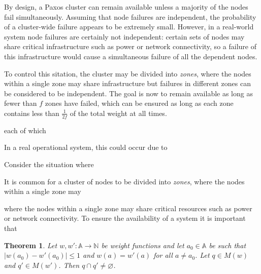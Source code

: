 \documentclass[journal]{IEEEtran}
\newtheorem{theorem}{Theorem}
\begin{document}
By design, a Paxos cluster can remain available unless a majority of the nodes
fail simultaneously. Assuming that node failures are independent, the
probability of a cluster-wide failure appears to be extremely small. However,
in a real-world system node failures are certainly not independent: certain
sets of nodes may share critical infrastructure such as power or network
connectivity, so a failure of this infrastructure would cause a simultaneous
failure of all the dependent nodes.

To control this sitation, the cluster may be divided into \textit{zones}, where
the nodes within a single zone may share infrastructure but failures in
different zones can be considered to be independent. The goal is now to remain
available as long as fewer than $f$ zones have failed, which can be ensured as
long as each zone contains less than $\frac{1}{2f}$ of the total weight at all
times.


each of which 

In a real operational system, this could occur
due to 

Consider the situation where 

It is common for a cluster of nodes to be divided into \textit{zones},
where the nodes within a single zone may 

where the nodes within a single zone may share critical resources such as power
or network connectivity. To ensure the availability of a system it is important
that 



\begin{theorem} \label{weights-nearly-equal} Let $w, w' : \mathbb A \to \mathbb
N$ be weight functions and let $a_0 \in \mathbb A$ be such that $|w(a_0) -
w'(a_0)| \le 1$ and $w(a) = w'(a)$ for all $a \ne a_0$.  Let $q \in M(w)$ and
$q' \in M(w')$. Then $q \cap q' \ne \varnothing$.  \end{theorem}
\end{document}
